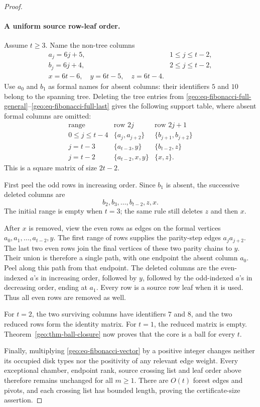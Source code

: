 \begin{proof}
\paragraph{A uniform source row-leaf order.}
Assume $t\ge3$.  Name the non-tree columns
\[
 \begin{array}{ll}
 a_j=6j+5,&1\le j\le t-2,\\
 b_j=6j+4,&2\le j\le t-2,\\
 x=6t-6,\quad y=6t-5,\quad z=6t-4.&
 \end{array}
 \tag{G22}\label{geo:eq-fibonacci-columns}
\]
Use $a_0$ and $b_1$ as formal names for absent columns: their identifiers
$5$ and $10$ belong to the spanning tree.  Deleting the tree entries from
\eqref{geo:eq-fibonacci-full-general}--\eqref{geo:eq-fibonacci-full-last}
gives the following support table, where absent formal columns are
omitted:
\[
\begin{array}{c|c|c}
\text{range}&\text{row }2j&\text{row }2j+1\\ \hline
0\le j\le t-4 &\{a_j,a_{j+2}\}&\{b_{j+1},b_{j+2}\}\\
j=t-3 &\{a_{t-3},y\}&\{b_{t-2},z\}\\
j=t-2 &\{a_{t-2},x,y\}&\{x,z\}.
\end{array}
 \tag{G23}\label{geo:eq-fibonacci-reduced}
\]
This is a square matrix of size $2t-2$.

First peel the odd rows in increasing order.  Since $b_1$ is absent, the
successive deleted columns are
\[
 b_2,b_3,\ldots,b_{t-2},z,x.
\]
The initial range is empty when $t=3$; the same rule still deletes $z$
and then $x$.

After $x$ is removed, view the even rows as edges on the formal vertices
$a_0,a_1,\ldots,a_{t-2},y$.  The first range of rows supplies the parity-step
edges $a_j a_{j+2}$.  The last two even rows join the final vertices of
these two parity chains to $y$.  Their union is therefore a single path,
with one endpoint the absent column $a_0$.  Peel along this path from that
endpoint.  The deleted columns are the even-indexed $a$'s in increasing
order, followed by $y$, followed by the odd-indexed $a$'s in decreasing
order, ending at $a_1$.  Every row is a source row leaf when it is used.
Thus all even rows are removed as well.

For $t=2$, the two surviving columns have identifiers $7$ and $8$, and the
two reduced rows form the identity matrix.  For $t=1$, the reduced matrix
is empty.  Theorem~\ref{geo:thm-ball-closure} now proves that the core is a
ball for every $t$.

Finally, multiplying \eqref{geo:eq-fibonacci-vector} by a positive integer
changes neither its occupied disk types nor the positivity of any relevant
edge weight.  Every exceptional chamber, endpoint rank, source crossing
list and leaf order above therefore remains unchanged for all $m\ge1$.
There are $O(t)$ forest edges and pivots, and each crossing list has bounded
length, proving the certificate-size assertion.
\end{proof}

